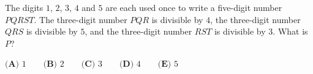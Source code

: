 The digits $1$, $2$, $3$, $4$ and $5$ are each used once to write a five-digit number $PQRST$. The three-digit number $PQR$ is divisible by $4$, the three-digit number $QRS$ is divisible by $5$, and the three-digit number $RST$ is divisible by $3$. What is $P$?

$\textbf{(A) }1\qquad\textbf{(B) }2\qquad\textbf{(C) }3\qquad\textbf{(D) }4\qquad\textbf{(E) }5$
